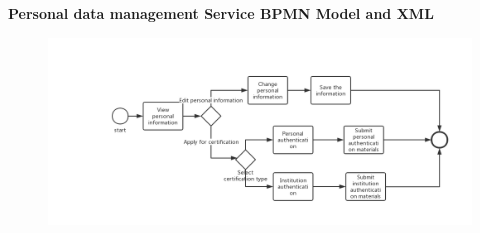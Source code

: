 \documentclass[runningheads]{llncs}
\begin{document}
    \clearpage
     \textbf{Personal data management Service BPMN Model and XML}\\
    \begin{figure}
        \centering %
        \includegraphics[width=1.0\textwidth]{figure/hyy/personaldatamanagement} %
        \label{Personal data management} %
   \end{figure}
\end{document}

